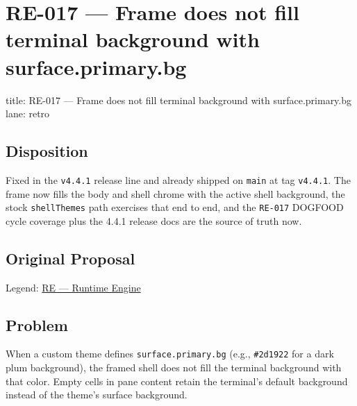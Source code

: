 \chapter{RE-017 --- Frame does not fill terminal background with surface.primary.bg}\label{record-366}

\smallskip

\begin{RecordMeta}
title: RE-017 — Frame does not fill terminal background with surface.primary.bg
lane: retro

\end{RecordMeta}

\section{Disposition}\label{record-366-disposition}

Fixed in the \texttt{v\allowbreak{}4\allowbreak{}.\allowbreak{}4\allowbreak{}.\allowbreak{}1} release line and already shipped on \texttt{m\allowbreak{}a\allowbreak{}i\allowbreak{}n} at tag \texttt{v\allowbreak{}4\allowbreak{}.\allowbreak{}4\allowbreak{}.\allowbreak{}1}. The frame now fills the body and shell chrome with the active shell background, the stock \texttt{s\allowbreak{}h\allowbreak{}e\allowbreak{}l\allowbreak{}l\allowbreak{}T\allowbreak{}h\allowbreak{}e\allowbreak{}m\allowbreak{}e\allowbreak{}s} path exercises that end to end, and the \texttt{R\allowbreak{}E\allowbreak{}-\allowbreak{}0\allowbreak{}1\allowbreak{}7} DOGFOOD cycle coverage plus the 4.4.1 release docs are the source of truth now.

\section{Original Proposal}\label{record-366-original-proposal}

Legend: \href{https://github.com/flyingrobots/bijou/blob/1853ad902f6bf219326409e7f743a5a1d6517dbc/docs/method/legends/RE-runtime-engine.md}{RE --- Runtime Engine}

\section{Problem}\label{record-366-problem}

When a custom theme defines \texttt{s\allowbreak{}u\allowbreak{}r\allowbreak{}f\allowbreak{}a\allowbreak{}c\allowbreak{}e\allowbreak{}.\allowbreak{}p\allowbreak{}r\allowbreak{}i\allowbreak{}m\allowbreak{}a\allowbreak{}r\allowbreak{}y\allowbreak{}.\allowbreak{}b\allowbreak{}g} (e.g., \texttt{\#\allowbreak{}2\allowbreak{}d\allowbreak{}1\allowbreak{}9\allowbreak{}2\allowbreak{}2} for a dark plum background), the framed shell does not fill the terminal background with that color. Empty cells in pane content retain the terminal's default background instead of the theme's surface background.

